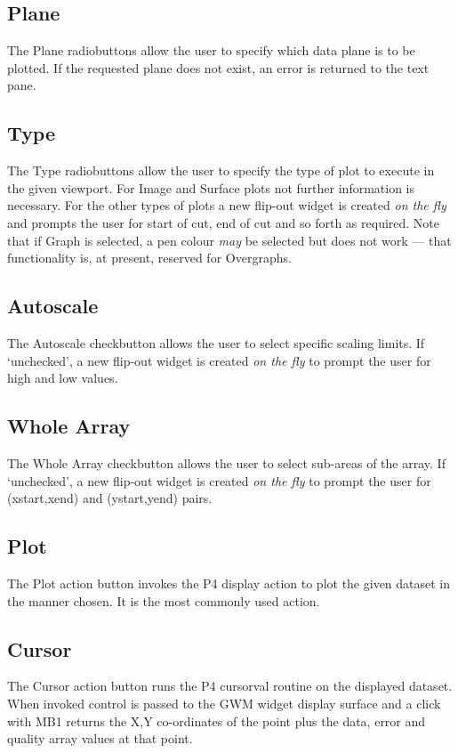 \documentclass[a4paper]{book}
\renewcommand{\_}{{\tt\char'137}}
\begin{document}
\subsection{Plane}
The {\sf Plane} radiobuttons allow the user to specify which data plane is to be
plotted. If the requested plane does not exist, an error is returned to the text pane.

\subsection{Type}
The {\sf Type} radiobuttons allow the user to specify the type of plot to execute
in the given viewport. For {\sf Image} and {\sf Surface} plots not further information
is necessary. For the other types of plots a new flip-out widget is created {\em on the
fly} and prompts the user for start of cut, end of cut and so forth as required. Note that if
{\sf Graph} is selected, a pen colour {\em may} be selected but does not work --- that 
functionality is, at present, reserved for {\sf Overgraphs}.

\subsection{Autoscale}
The {\sf Autoscale} checkbutton allows the user to select specific scaling limits.
If `unchecked', a new flip-out widget is created {\em on the fly} to prompt the user for
high and low values. 

\subsection{Whole Array}
The {\sf Whole Array} checkbutton allows the user to select sub-areas of the array.
If `unchecked', a new flip-out widget is created {\em on the fly} to prompt the user for
(xstart,xend) and (ystart,yend) pairs.

\subsection{Plot}
The {\sf Plot} action button invokes the P4 display action to plot the given dataset
in the manner chosen. It is the most commonly used action.

\subsection{Cursor}
The {\sf Cursor} action button runs the P4 cursorval routine on the displayed dataset. 
When invoked control is passed to the GWM widget display surface and a click with
MB1 returns the X,Y co-ordinates of the point plus the data, error and quality array
values at that point.
\end{document}
